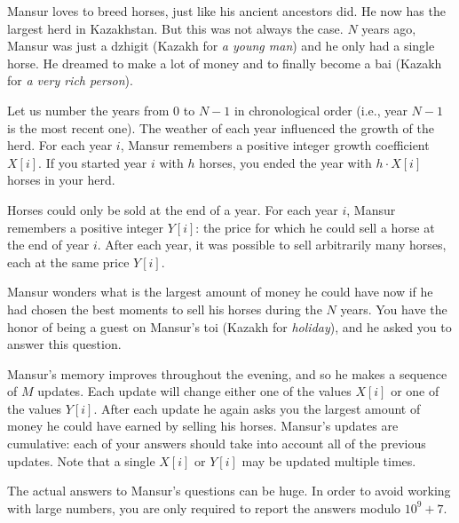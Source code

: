 Mansur loves to breed horses, just like his ancient ancestors did. He now has the largest herd in Kazakhstan. But this was not always the case. $N$ years ago, Mansur was just a dzhigit (Kazakh for \textit{a young man}) and he only had a single horse. He dreamed to make a lot of money and to finally become a bai (Kazakh for \textit{a very rich person}).

Let us number the years from 0 to $N - 1$ in chronological order (i.e., year $N - 1$ is the most recent one). The weather of each year influenced the growth of the herd. For each year $i$, Mansur remembers a positive integer growth coefficient $X[i]$. If you started year $i$ with $h$ horses, you ended the year with $h \cdot X[i]$ horses in your herd.

Horses could only be sold at the end of a year. For each year $i$, Mansur remembers a positive integer $Y[i]$: the price for which he could sell a horse at the end of year $i$. After each year, it was possible to
sell arbitrarily many horses, each at the same price $Y[i]$.

Mansur wonders what is the largest amount of money he could have now if he had chosen the best moments to sell his horses during the $N$ years. You have the honor of being a guest on Mansur's toi (Kazakh for \textit{holiday}), and he asked you to answer this question.

Mansur's memory improves throughout the evening, and so he makes a sequence of $M$ updates. Each update will change either one of the values $X[i]$ or one of the values $Y[i]$. After each update he again asks you the largest amount of money he could have earned by selling his horses. Mansur's updates are cumulative: each of your answers should take into account all of the previous updates. Note that a single $X[i]$ or $Y[i]$ may be updated multiple times.

The actual answers to Mansur's questions can be huge. In order to avoid working with large numbers, you are only required to report the answers modulo $10^9 + 7$.

